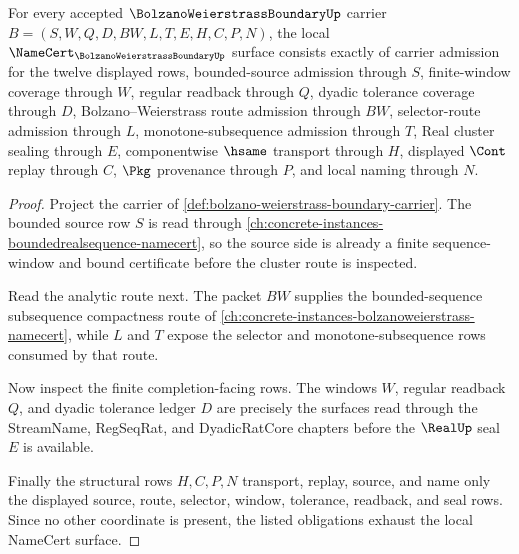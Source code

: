 \begin{theorem}
\label{thm:bolzano-weierstrass-boundary-namecert-obligations}
For every accepted $\BolzanoWeierstrassBoundaryUp$ carrier $B=(S,W,Q,D,BW,L,T,E,H,C,P,N)$, the local $\NameCert_{\BolzanoWeierstrassBoundaryUp}$ surface consists exactly of carrier admission for the twelve displayed rows, bounded-source admission through $S$, finite-window coverage through $W$, regular readback through $Q$, dyadic tolerance coverage through $D$, Bolzano--Weierstrass route admission through $BW$, selector-route admission through $L$, monotone-subsequence admission through $T$, Real cluster sealing through $E$, componentwise $\hsame$ transport through $H$, displayed $\Cont$ replay through $C$, $\Pkg$ provenance through $P$, and local naming through $N$.
\end{theorem}
\begin{proof}
Project the carrier of \autoref{def:bolzano-weierstrass-boundary-carrier}. The bounded source row $S$ is read through \autoref{ch:concrete-instances-boundedrealsequence-namecert}, so the source side is already a finite sequence-window and bound certificate before the cluster route is inspected.

Read the analytic route next. The packet $BW$ supplies the bounded-sequence subsequence compactness route of \autoref{ch:concrete-instances-bolzanoweierstrass-namecert}, while $L$ and $T$ expose the selector and monotone-subsequence rows consumed by that route.

Now inspect the finite completion-facing rows. The windows $W$, regular readback $Q$, and dyadic tolerance ledger $D$ are precisely the surfaces read through the StreamName, RegSeqRat, and DyadicRatCore chapters before the $\RealUp$ seal $E$ is available.

Finally the structural rows $H,C,P,N$ transport, replay, source, and name only the displayed source, route, selector, window, tolerance, readback, and seal rows. Since no other coordinate is present, the listed obligations exhaust the local NameCert surface.
\end{proof}

